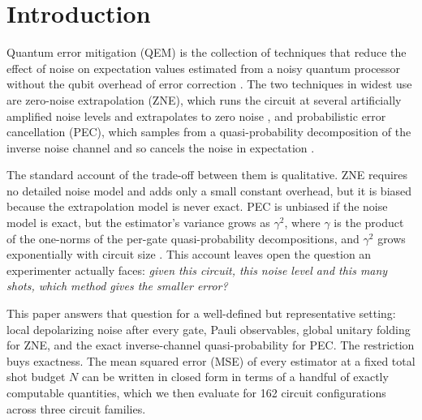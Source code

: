 \documentclass[aps,pra,reprint,amsmath,amssymb,nofootinbib,superscriptaddress]{revtex4-2}
\theoremstyle{remark}
\begin{document}
\maketitle



\section{Introduction}

Quantum error mitigation (QEM) is the collection of techniques that reduce the effect of noise on expectation values estimated from a noisy quantum processor without the qubit overhead of error correction \cite{temme2017,li2017,endo2018,cai2023rmp}. The two techniques in widest use are zero-noise extrapolation (ZNE), which runs the circuit at several artificially amplified noise levels and extrapolates to zero noise \cite{temme2017,li2017,kandala2019,giurgicatiron2020,kim2023}, and probabilistic error cancellation (PEC), which samples from a quasi-probability decomposition of the inverse noise channel and so cancels the noise in expectation \cite{temme2017,endo2018,vandenberg2023}.

The standard account of the trade-off between them is qualitative. ZNE requires no detailed noise model and adds only a small constant overhead, but it is biased because the extrapolation model is never exact. PEC is unbiased if the noise model is exact, but the estimator's variance grows as $\gamma^2$, where $\gamma$ is the product of the one-norms of the per-gate quasi-probability decompositions, and $\gamma^2$ grows exponentially with circuit size \cite{temme2017,takagi2022,quek2022,tsubouchi2023}. This account leaves open the question an experimenter actually faces: \emph{given this circuit, this noise level and this many shots, which method gives the smaller error?}

This paper answers that question for a well-defined but representative setting: local depolarizing noise after every gate, Pauli observables, global unitary folding for ZNE, and the exact inverse-channel quasi-probability for PEC. The restriction buys exactness. The mean squared error (MSE) of every estimator at a fixed total shot budget $N$ can be written in closed form in terms of a handful of exactly computable quantities, which we then evaluate for 162 circuit configurations across three circuit families.
\end{document}
